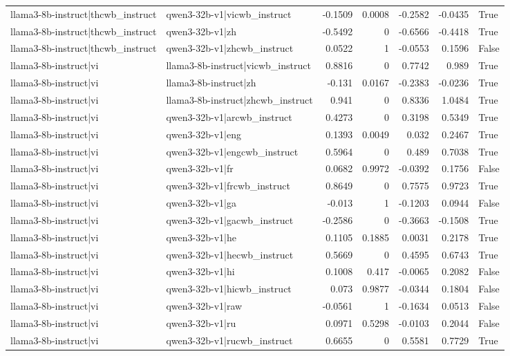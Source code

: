 \begin{table}
\begin{tabular}{l l r r r r l}
llama3-8b-instruct|thcwb_instruct & qwen3-32b-v1|vicwb_instruct & -0.1509 & 0.0008 & -0.2582 & -0.0435 & True \\
llama3-8b-instruct|thcwb_instruct & qwen3-32b-v1|zh & -0.5492 & 0 & -0.6566 & -0.4418 & True \\
llama3-8b-instruct|thcwb_instruct & qwen3-32b-v1|zhcwb_instruct & 0.0522 & 1 & -0.0553 & 0.1596 & False \\
llama3-8b-instruct|vi & llama3-8b-instruct|vicwb_instruct & 0.8816 & 0 & 0.7742 & 0.989 & True \\
llama3-8b-instruct|vi & llama3-8b-instruct|zh & -0.131 & 0.0167 & -0.2383 & -0.0236 & True \\
llama3-8b-instruct|vi & llama3-8b-instruct|zhcwb_instruct & 0.941 & 0 & 0.8336 & 1.0484 & True \\
llama3-8b-instruct|vi & qwen3-32b-v1|arcwb_instruct & 0.4273 & 0 & 0.3198 & 0.5349 & True \\
llama3-8b-instruct|vi & qwen3-32b-v1|eng & 0.1393 & 0.0049 & 0.032 & 0.2467 & True \\
llama3-8b-instruct|vi & qwen3-32b-v1|engcwb_instruct & 0.5964 & 0 & 0.489 & 0.7038 & True \\
llama3-8b-instruct|vi & qwen3-32b-v1|fr & 0.0682 & 0.9972 & -0.0392 & 0.1756 & False \\
llama3-8b-instruct|vi & qwen3-32b-v1|frcwb_instruct & 0.8649 & 0 & 0.7575 & 0.9723 & True \\
llama3-8b-instruct|vi & qwen3-32b-v1|ga & -0.013 & 1 & -0.1203 & 0.0944 & False \\
llama3-8b-instruct|vi & qwen3-32b-v1|gacwb_instruct & -0.2586 & 0 & -0.3663 & -0.1508 & True \\
llama3-8b-instruct|vi & qwen3-32b-v1|he & 0.1105 & 0.1885 & 0.0031 & 0.2178 & True \\
llama3-8b-instruct|vi & qwen3-32b-v1|hecwb_instruct & 0.5669 & 0 & 0.4595 & 0.6743 & True \\
llama3-8b-instruct|vi & qwen3-32b-v1|hi & 0.1008 & 0.417 & -0.0065 & 0.2082 & False \\
llama3-8b-instruct|vi & qwen3-32b-v1|hicwb_instruct & 0.073 & 0.9877 & -0.0344 & 0.1804 & False \\
llama3-8b-instruct|vi & qwen3-32b-v1|raw & -0.0561 & 1 & -0.1634 & 0.0513 & False \\
llama3-8b-instruct|vi & qwen3-32b-v1|ru & 0.0971 & 0.5298 & -0.0103 & 0.2044 & False \\
llama3-8b-instruct|vi & qwen3-32b-v1|rucwb_instruct & 0.6655 & 0 & 0.5581 & 0.7729 & True \\

\end{tabular}
\end{table}
